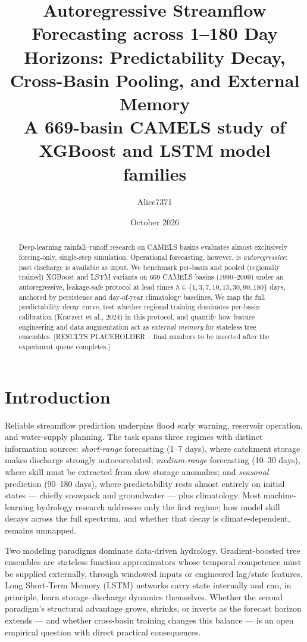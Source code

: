 \documentclass[11pt]{article}
\title{Autoregressive Streamflow Forecasting across 1--180 Day Horizons:
Predictability Decay, Cross-Basin Pooling, and External Memory\\[6pt]
\large A 669-basin CAMELS study of XGBoost and LSTM model families}
\author{Alice7371}
\date{October 2026}
\begin{document}
\maketitle

\begin{abstract}
\noindent Deep-learning rainfall--runoff research on CAMELS basins evaluates
almost exclusively forcing-only, single-step simulation. Operational
forecasting, however, is \emph{autoregressive}: past discharge is available as
input. We benchmark per-basin and pooled (regionally trained) XGBoost and LSTM
variants on 669 CAMELS basins (1990--2009) under an autoregressive,
leakage-safe protocol at lead times $h \in \{1,3,7,10,15,30,90,180\}$ days,
anchored by persistence and day-of-year climatology baselines. We map the full
predictability decay curve, test whether regional training dominates
per-basin calibration (Kratzert et al., 2024) in this protocol, and quantify
how feature engineering and data augmentation act as \emph{external memory}
for stateless tree ensembles. [RESULTS PLACEHOLDER -- final numbers to be
inserted after the experiment queue completes.]
\end{abstract}

\section{Introduction}
Reliable streamflow prediction underpins flood early warning, reservoir
operation, and water-supply planning. The task spans three regimes with
distinct information sources: \emph{short-range} forecasting (1--7 days),
where catchment storage makes discharge strongly autocorrelated;
\emph{medium-range} forecasting (10--30 days), where skill must be extracted
from slow storage anomalies; and \emph{seasonal} prediction (90--180 days),
where predictability rests almost entirely on initial states --- chiefly
snowpack and groundwater --- plus climatology. Most machine-learning hydrology
research addresses only the first regime; how model skill decays across the
full spectrum, and whether that decay is climate-dependent, remains unmapped.

Two modeling paradigms dominate data-driven hydrology. Gradient-boosted tree
ensembles are stateless function approximators whose temporal competence must
be supplied externally, through windowed inputs or engineered lag/state
features. Long Short-Term Memory (LSTM) networks carry state internally and
can, in principle, learn storage--discharge dynamics themselves. Whether the
second paradigm's structural advantage grows, shrinks, or inverts as the
forecast horizon extends --- and whether cross-basin training changes this
balance --- is an open empirical question with direct practical consequences.
\end{document}
